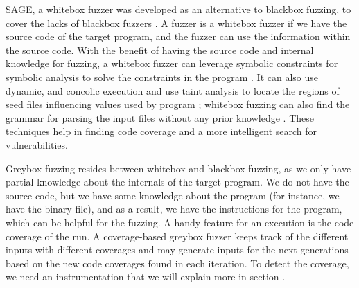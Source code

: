 \vspace{1.5\baselineskip}

SAGE, a whitebox fuzzer was developed as an alternative to blackbox fuzzing, to cover the lacks of blackbox fuzzers \cite{godefroid2012sage}. A fuzzer is a whitebox fuzzer if we have the source code of the target program, and the fuzzer can use the information within the source code. With the benefit of having the source code and internal knowledge for fuzzing, a whitebox fuzzer can leverage symbolic constraints for symbolic analysis to solve the constraints in the program \cite{cadar2011symbolic}. It can also use dynamic, and concolic execution \cite{stephens2016driller} and use taint analysis to locate the regions of seed files influencing values used by program \cite{ganesh2009taint}; whitebox fuzzing can also find the grammar for parsing the input files without any prior knowledge \cite{godefroid2008grammar}. These techniques help in finding code coverage and a more intelligent search for vulnerabilities.




\vspace{1.5\baselineskip}

Greybox fuzzing resides between whitebox and blackbox fuzzing, as we only have partial knowledge about the internals of the target program. We do not have the source code, but we have some knowledge about the program (for instance, we have the binary file), and as a result, we have the instructions for the program, which can be helpful for the fuzzing. A handy feature for an execution is the code coverage of the run. A coverage-based greybox fuzzer keeps track of the different inputs with different coverages and may generate inputs for the next generations based on the new code coverages found in each iteration. To detect the coverage, we need an instrumentation \cite{liang2018fuzzing} that we will explain more in section . 

